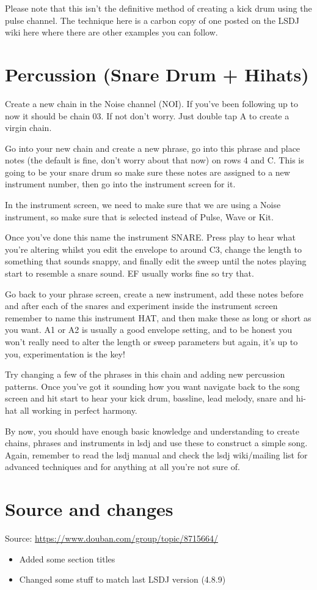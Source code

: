 \documentclass[]{article}
\begin{document}
Please note that this isn’t the definitive method of creating a kick drum using the pulse channel. The technique here is a carbon copy of one posted on the LSDJ wiki here where there are other examples you can follow.

\section{Percussion (Snare Drum + Hihats)}
Create a new chain in the Noise channel (NOI). If you’ve been following up to now it should be chain 03. If not don’t worry. Just double tap A to create a virgin chain.

Go into your new chain and create a new phrase, go into this phrase and place notes (the default is fine, don’t worry about that now) on rows 4 and C. This is going to be your snare drum so make sure these notes are assigned to a new instrument number, then go into the instrument screen for it.

In the instrument screen, we need to make sure that we are using a Noise instrument, so make sure that is selected instead of Pulse, Wave or Kit.

Once you’ve done this name the instrument SNARE. Press play to hear what you’re altering whilst you edit the envelope to around C3, change the length to something that sounds snappy, and finally edit the sweep until the notes playing start to resemble a snare sound. EF usually works fine so try that.

Go back to your phrase screen, create a new instrument, add these notes before and after each of the snares and experiment inside the instrument screen remember to name this instrument HAT, and then make these as long or short as you want. A1 or A2 is usually a good envelope setting, and to be honest you won’t really need to alter the length or sweep parameters but again, it’s up to you, experimentation is the key!

Try changing a few of the phrases in this chain and adding new percussion patterns. Once you’ve got it sounding how you want navigate back to the song screen and hit start to hear your kick drum, bassline, lead melody, snare and hi-hat all working in perfect harmony.

By now, you should have enough basic knowledge and understanding to create chains, phrases and instruments in lsdj and use these to construct a simple song. Again, remember to read the lsdj manual and check the lsdj wiki/mailing list for advanced techniques and for anything at all you’re not sure of.


\section*{Source and changes}

Source: \url{https://www.douban.com/group/topic/8715664/}

\begin{itemize}
	\item Added some section titles
	\item Changed some stuff to match last LSDJ version (4.8.9)
\end{itemize}
\end{document}
